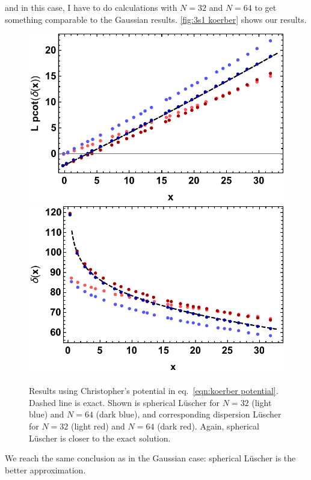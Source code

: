 \documentclass[11pt]{article}
\begin{document}
and in this case, I have to do calculations with $N=32$ and $N=64$ to get something comparable to the Gaussian results. \autoref{fig:3s1 koerber} shows our results.
\begin{figure}
\includegraphics[width=.5\textwidth]{figs/pcotd_3S1_koerber.pdf}\includegraphics[width=.5\textwidth]{figs/delta_3S1_koerber.pdf}
\caption{Results using Christopher's potential in eq.~\eqref{eqn:koerber potential}.  Dashed line is exact.  Shown is spherical L\"uscher for $N=32$ (light blue) and $N=64$ (dark blue), and corresponding dispersion L\"uscher for $N=32$ (light red) and $N=64$ (dark red). Again, spherical L\"uscher is closer to the exact solution. \label{fig:3s1 koerber} }
\end{figure}
We reach the same conclusion as in the Gaussian case:  spherical L\"uscher is the better approximation.  
\end{document}
